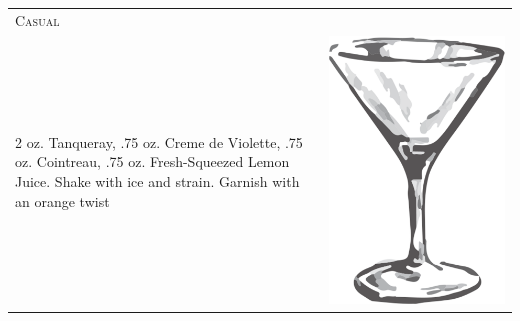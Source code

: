 \documentclass{article}
\begin{document}
\begin{multicols}{2}
\begin{tabular}{p{2in} p{0.5in}}
\multicolumn{2}{p{3in}}{\centering\Huge\textsc{Casual}}\\ 
  \vspace{-0.1in}2 oz. Tanqueray, .75 oz. Creme de Violette, .75 oz. Cointreau, .75 oz. Fresh-Squeezed Lemon Juice. Shake with ice and strain. Garnish with an orange twist &
  \vspace{-0.1in} \includegraphics{goblet.png}
\end{tabular}


\end{multicols}
\end{document}

